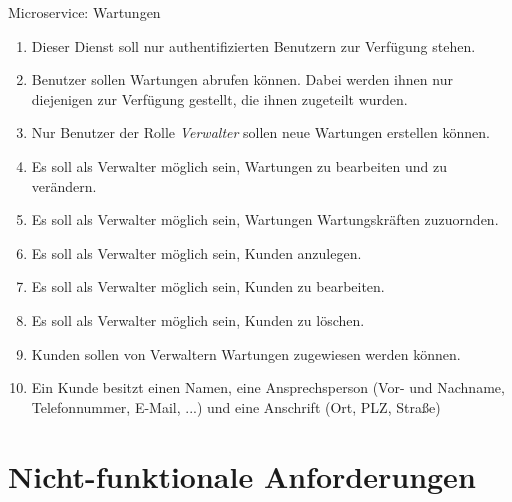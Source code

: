 \documentclass[12pt]{scrreprt}
\newcommand{\itemh}[1]{{\bfseries\large\item #1}}
\begin{document}
\begin{enumerate}
    \itemh{Microservice: Wartungen}
    \begin{enumerate}
      \item Dieser Dienst soll nur authentifizierten Benutzern zur Verfügung stehen.
      \item Benutzer sollen Wartungen abrufen können. Dabei werden ihnen nur diejenigen zur Verfügung gestellt, die
        ihnen zugeteilt wurden.
      \item Nur Benutzer der Rolle \textit{Verwalter} sollen neue Wartungen erstellen können.
      \item Es soll als Verwalter möglich sein, Wartungen zu bearbeiten und zu verändern.
      \item Es soll als Verwalter möglich sein, Wartungen Wartungskräften zuzuornden.
      \item Es soll als Verwalter möglich sein, Kunden anzulegen.
      \item Es soll als Verwalter möglich sein, Kunden zu bearbeiten.
      \item Es soll als Verwalter möglich sein, Kunden zu löschen.
      \item Kunden sollen von Verwaltern Wartungen zugewiesen werden können.
      \item Ein Kunde besitzt einen Namen, eine Ansprechsperson (Vor- und Nachname, Telefonnummer, E-Mail, ...) und eine
        Anschrift (Ort, PLZ, Straße)
    \end{enumerate}
  \end{enumerate}

  \section{Nicht-funktionale Anforderungen}
\end{document}
